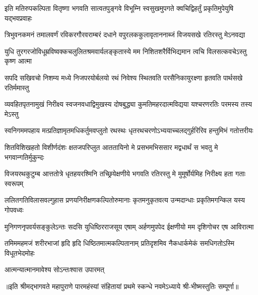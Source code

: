 

\twolineshloka
{इति मतिरुपकल्पिता वितृष्णा भगवति सात्वतपुङ्गवे विभूम्नि}
{स्वसुखमुपगते क्वचिद्विहर्तुं प्रकृतिमुपेयुषि यद्भवप्रवाहः}

\twolineshloka
{त्रिभुवनकमनं तमालवर्णं रविकरगौरवराम्बरं दधाने}
{वपुरलककुलावृताननाब्जं विजयसखे रतिरस्तु मेऽनवद्या}

\twolineshloka
{युधि तुरगरजोविधूम्रविष्वक्कचलुलितश्रमवार्यलङ्कृतास्ये}
{मम निशितशरैर्विभिद्यमान त्वचि विलसत्कवचेऽस्तु कृष्ण आत्मा}

\twolineshloka
{सपदि सखिवचो निशम्य मध्ये निजपरयोर्बलयो रथं निवेश्य}
{स्थितवति परसैनिकायुरक्ष्णा हृतवति पार्थसखे रतिर्ममास्तु}

\twolineshloka
{व्यवहितपृतनामुखं निरीक्ष्य स्वजनवधाद्विमुखस्य दोषबुद्ध्या}
{कुमतिमहरदात्मविद्यया यश्चरणरतिः परमस्य तस्य मेऽस्तु}

\twolineshloka
{स्वनिगममपहाय मत्प्रतिज्ञामृतमधिकर्तुमवप्लुतो रथस्थः}
{धृतरथचरणोऽभ्ययाच्चलद्गुर्हरिरिव हन्तुमिभं गतोत्तरीयः}

\twolineshloka
{शितविशिखहतो विशीर्णदंशः क्षतजपरिप्लुत आततायिनो मे}
{प्रसभमभिससार मद्वधार्थं स भवतु मे भगवान्गतिर्मुकुन्दः}

\twolineshloka
{विजयरथकुटुम्ब आत्ततोत्रे धृतहयरश्मिनि तच्छ्रियेक्षणीये}
{भगवति रतिरस्तु मे मुमूर्षोर्यमिह निरीक्ष्य हता गताः स्वरूपम्}

\twolineshloka
{ललितगतिविलासवल्गुहास प्रणयनिरीक्षणकल्पितोरुमानाः}
{कृतमनुकृतवत्य उन्मदान्धाः प्रकृतिमगन्किल यस्य गोपवध्वः}

\twolineshloka
{मुनिगणनृपवर्यसङ्कुलेऽन्तः सदसि युधिष्ठिरराजसूय एषाम्}
{अर्हणमुपपेद ईक्षणीयो मम दृशिगोचर एष आविरात्मा}

\twolineshloka
{तमिममहमजं शरीरभाजां हृदि हृदि धिष्ठितमात्मकल्पितानाम्}
{प्रतिदृशमिव नैकधार्कमेकं समधिगतोऽस्मि विधूतभेदमोहः}

{आत्मन्यात्मानमावेश्य सोऽन्तःश्वास उपारमत्}

{॥इति श्रीमद्भागवते महापुराणे पारमहंस्यां संहितायां प्रथमे स्कन्धे नवमेऽध्याये श्री-भीष्मस्तुतिः सम्पूर्णा॥}
